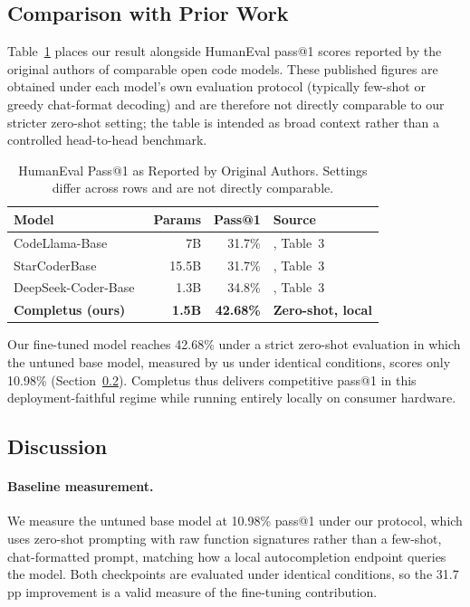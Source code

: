 \subsection{Comparison with Prior Work}

Table~\ref{tab:comparison} places our result alongside HumanEval
pass@1 scores reported by the original authors of comparable open code
models. These published figures are obtained under each model's own
evaluation protocol (typically few-shot or greedy chat-format decoding)
and are therefore not directly comparable to our stricter zero-shot
setting; the table is intended as broad context rather than a
controlled head-to-head benchmark.

\begin{table}[htbp]
  \centering
  \caption{HumanEval Pass@1 as Reported by Original Authors. Settings
  differ across rows and are not directly comparable.}
  \label{tab:comparison}
  \begin{tabular}{lrrl}
    \toprule
    \textbf{Model} & \textbf{Params} & \textbf{Pass@1} & \textbf{Source} \\
    \midrule
    CodeLlama-Base~\cite{Roziere2023CodeLlama}    & 7B    & 31.7\% & \cite{Guo2024DeepSeek}, Table~3 \\
    StarCoderBase~\cite{Li2023StarCoder}          & 15.5B & 31.7\% & \cite{Guo2024DeepSeek}, Table~3 \\
    DeepSeek-Coder-Base~\cite{Guo2024DeepSeek}   & 1.3B  & 34.8\% & \cite{Guo2024DeepSeek}, Table~3 \\
    \midrule
    \textbf{Completus (ours)} & \textbf{1.5B} & \textbf{42.68\%} & \textbf{Zero-shot, local} \\
    \bottomrule
  \end{tabular}
\end{table}

Our fine-tuned model reaches 42.68\% under a strict zero-shot
evaluation in which the untuned base model, measured by us under
identical conditions, scores only 10.98\% (Section~\ref{ssec:disc}).
Completus thus delivers competitive pass@1 in this deployment-faithful
regime while running entirely locally on consumer hardware.

\subsection{Discussion}
\label{ssec:disc}

\paragraph{Baseline measurement.}
We measure the untuned base model at 10.98\% pass@1 under our protocol,
which uses zero-shot prompting with raw function signatures rather than
a few-shot, chat-formatted prompt, matching how a local autocompletion
endpoint queries the model. Both checkpoints are evaluated under
identical conditions, so the 31.7\,pp improvement is a valid measure
of the fine-tuning contribution.


